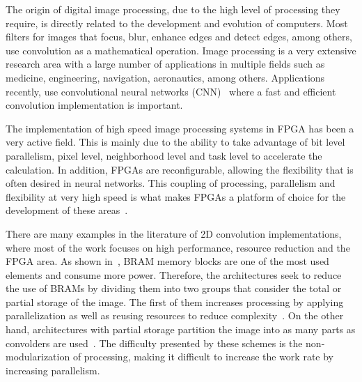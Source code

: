\documentclass[conference,compsoc]{IEEEtran}
\begin{document}



The origin of digital image processing, due to the high level of processing they
require, is directly related to the development and evolution of computers. Most
filters for images that focus, blur, enhance edges and detect edges, among
others, use convolution as a mathematical operation. Image processing is a very
extensive research area with a large number of applications in multiple fields
such as medicine, engineering, navigation, aeronautics, among others.
Applications recently, use convolutional neural networks
(CNN)~\cite{Lecun-et-al-1998} where a fast and efficient convolution
implementation is important.

The implementation of high speed image processing systems in FPGA has been a
very active field. This is mainly due to the ability to take advantage of bit
level parallelism, pixel level, neighborhood level and task level to accelerate
the calculation. In addition, FPGAs are reconfigurable, allowing the flexibility
that is often desired in neural networks. This coupling of processing,
parallelism and flexibility at very high speed is what makes FPGAs a platform of
choice for the development of these areas~\cite{papercnn}.

There are many examples in the literature of 2D convolution implementations,
where most of the work focuses on high performance, resource reduction and the
FPGA area. As shown in~\cite{paper3}, BRAM memory blocks are one of the most
used elements and consume more power. Therefore, the architectures seek to
reduce the use of BRAMs by dividing them into two groups that consider the total
or partial storage of the image. The first of them increases processing by
applying parallelization as well as reusing resources to reduce
complexity~\cite{paper1,paper5}. On the other hand, architectures with partial
storage partition the image into as many parts as convolders are
used~\cite{paper2,paper4}. The difficulty presented by these schemes is the
non-modularization of processing, making it difficult to increase the work rate
by increasing parallelism.
\end{document}
